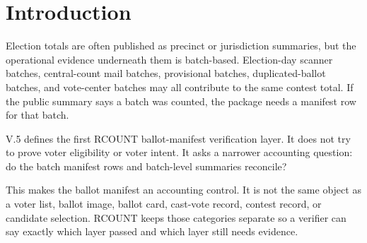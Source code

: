 \section{Introduction}

Election totals are often published as precinct or jurisdiction summaries, but
the operational evidence underneath them is batch-based. Election-day scanner
batches, central-count mail batches, provisional batches, duplicated-ballot
batches, and vote-center batches may all contribute to the same contest total.
If the public summary says a batch was counted, the package needs a manifest row
for that batch.

V.5 defines the first RCOUNT ballot-manifest verification layer. It does not
try to prove voter eligibility or voter intent. It asks a narrower accounting
question: do the batch manifest rows and batch-level summaries reconcile?

This makes the ballot manifest an accounting control. It is not the same object
as a voter list, ballot image, ballot card, cast-vote record, contest record, or
candidate selection. RCOUNT keeps those categories separate so a verifier can
say exactly which layer passed and which layer still needs evidence.
